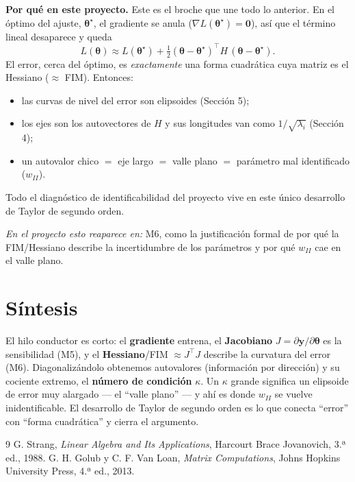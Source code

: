 \documentclass[11pt,a4paper]{article}
\newcommand{\thetavec}{\bm{\theta}}
\newcommand{\transp}{^{\top}}
\begin{document}
\textbf{Por qué en este proyecto.} Este es el broche que une todo lo anterior. En el óptimo del ajuste, $\thetavec^\star$, el gradiente se anula ($\nabla L(\thetavec^\star)=\bm0$), así que el término lineal desaparece y queda
\[
L(\thetavec)\approx L(\thetavec^\star)+\tfrac12(\thetavec-\thetavec^\star)\transp H\,(\thetavec-\thetavec^\star).
\]
El error, cerca del óptimo, es \emph{exactamente} una forma cuadrática cuya matriz es el Hessiano ($\approx$ FIM). Entonces:
\begin{itemize}[nosep]
  \item las curvas de nivel del error son elipsoides (Sección 5);
  \item los ejes son los autovectores de $H$ y sus longitudes van como $1/\sqrt{\lambda_i}$ (Sección 4);
  \item un autovalor chico $=$ eje largo $=$ valle plano $=$ parámetro mal identificado ($w_{II}$).
\end{itemize}
Todo el diagnóstico de identificabilidad del proyecto vive en este único desarrollo de Taylor de segundo orden.

\emph{En el proyecto esto reaparece en:} M6, como la justificación formal de por qué la FIM/Hessiano describe la incertidumbre de los parámetros y por qué $w_{II}$ cae en el valle plano.

\section*{Síntesis}

El hilo conductor es corto: el \textbf{gradiente} entrena, el \textbf{Jacobiano} $J=\partial\mathbf{y}/\partial\thetavec$ es la sensibilidad (M5), y el \textbf{Hessiano}/FIM $\approx J\transp J$ describe la curvatura del error (M6). Diagonalizándolo obtenemos autovalores (información por dirección) y su cociente extremo, el \textbf{número de condición} $\kappa$. Un $\kappa$ grande significa un elipsoide de error muy alargado --- el ``valle plano'' --- y ahí es donde $w_{II}$ se vuelve inidentificable. El desarrollo de Taylor de segundo orden es lo que conecta ``error'' con ``forma cuadrática'' y cierra el argumento.

\begin{thebibliography}{9}
 G. Strang, \emph{Linear Algebra and Its Applications}, Harcourt Brace Jovanovich, 3.ª ed., 1988.
 G. H. Golub y C. F. Van Loan, \emph{Matrix Computations}, Johns Hopkins University Press, 4.ª ed., 2013.
\end{thebibliography}
\end{document}
